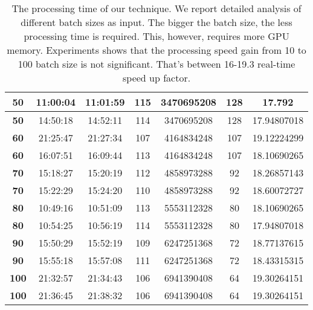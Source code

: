 \documentclass[journal]{IEEEtran}
\begin{document}
\begin{table*}[]
\begin{tabular}{|c|c|c|c|c|c|c|}
\textbf{50}         & 11:00:04               & 11:01:59          & 115                 & 3470695208      & 128                    & 17.792                            \\ \hline
\textbf{50}         & 14:50:18               & 14:52:11          & 114                 & 3470695208      & 128                    & 17.94807018                       \\ \hline
\textbf{60}         & 21:25:47               & 21:27:34          & 107                 & 4164834248      & 107                    & 19.12224299                       \\ \hline
\textbf{60}         & 16:07:51               & 16:09:44          & 113                 & 4164834248      & 107                    & 18.10690265                       \\ \hline
\textbf{70}         & 15:18:27               & 15:20:19          & 112                 & 4858973288      & 92                     & 18.26857143                       \\ \hline
\textbf{70}         & 15:22:29               & 15:24:20          & 110                 & 4858973288      & 92                     & 18.60072727                       \\ \hline
\textbf{80}         & 10:49:16               & 10:51:09          & 113                 & 5553112328      & 80                     & 18.10690265                       \\ \hline
\textbf{80}         & 10:54:25               & 10:56:19          & 114                 & 5553112328      & 80                     & 17.94807018                       \\ \hline
\textbf{90}         & 15:50:29               & 15:52:19          & 109                 & 6247251368      & 72                     & 18.77137615                       \\ \hline
\textbf{90}         & 15:55:18               & 15:57:08          & 111                 & 6247251368      & 72                     & 18.43315315                       \\ \hline
\textbf{100}        & 21:32:57               & 21:34:43          & 106                 & 6941390408      & 64                     & 19.30264151                       \\ \hline
\textbf{100}        & 21:36:45               & 21:38:32          & 106                 & 6941390408      & 64                     & 19.30264151                       \\ \hline
\end{tabular}
\caption{The processing time of our technique. We report detailed analysis of different batch sizes as input. The bigger the batch size, the less processing time is required. This, however, requires more GPU memory. Experiments shows that the processing speed gain from 10 to 100 batch size is not significant. That’s between 16-19.3 real-time speed up factor.}  
\label{tab:PT}
\end{table*}
\end{document}

